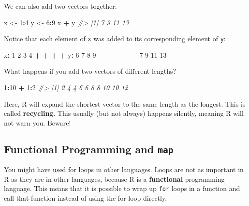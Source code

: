 \documentclass[]{book}
\newenvironment{Shaded}{\begin{snugshade}}{\end{snugshade}}
\newcommand{\DecValTok}[1]{\textcolor[rgb]{0.00,0.00,0.81}{#1}}
\newcommand{\StringTok}[1]{\textcolor[rgb]{0.31,0.60,0.02}{#1}}
\newcommand{\CommentTok}[1]{\textcolor[rgb]{0.56,0.35,0.01}{\textit{#1}}}
\newcommand{\OperatorTok}[1]{\textcolor[rgb]{0.81,0.36,0.00}{\textbf{#1}}}
\newcommand{\NormalTok}[1]{#1}
\begin{document}
We can also add two vectors together:

\begin{Shaded}
\begin{Highlighting}[]
\NormalTok{x <-}\StringTok{ }\DecValTok{1}\OperatorTok{:}\DecValTok{4}
\NormalTok{y <-}\StringTok{ }\DecValTok{6}\OperatorTok{:}\DecValTok{9}
\NormalTok{x }\OperatorTok{+}\StringTok{ }\NormalTok{y}
\CommentTok{#> [1]  7  9 11 13}
\end{Highlighting}
\end{Shaded}

Notice that each element of \texttt{x} was added to its corresponding
element of \texttt{y}:

\begin{Shaded}
\begin{Highlighting}[]
\NormalTok{x}\OperatorTok{:}\StringTok{  }\DecValTok{1}  \DecValTok{2}  \DecValTok{3}  \DecValTok{4}
    \OperatorTok{+}\StringTok{  }\OperatorTok{+}\StringTok{  }\OperatorTok{+}\StringTok{  }\OperatorTok{+}
\NormalTok{y}\OperatorTok{:}\StringTok{  }\DecValTok{6}  \DecValTok{7}  \DecValTok{8}  \DecValTok{9}
\OperatorTok{---------------}
\StringTok{    }\DecValTok{7}  \DecValTok{9} \DecValTok{11} \DecValTok{13}
\end{Highlighting}
\end{Shaded}

What happens if you add two vectors of different lengths?

\begin{Shaded}
\begin{Highlighting}[]
\DecValTok{1}\OperatorTok{:}\DecValTok{10} \OperatorTok{+}\StringTok{ }\DecValTok{1}\OperatorTok{:}\DecValTok{2}
\CommentTok{#>  [1]  2  4  4  6  6  8  8 10 10 12}
\end{Highlighting}
\end{Shaded}

Here, R will expand the shortest vector to the same length as the
longest. This is called \textbf{recycling}. This usually (but not
always) happens silently, meaning R will not warn you. Beware!

\subsection{\texorpdfstring{Functional Programming and
\texttt{map}}{Functional Programming and map}}\label{functional-programming-and-map}

You might have used for loops in other languages. Loops are not as
important in R as they are in other languages, because R is a
\textbf{functional} programming language. This means that it is possible
to wrap up \texttt{for} loops in a function and call that function
instead of using the for loop directly.
\end{document}
